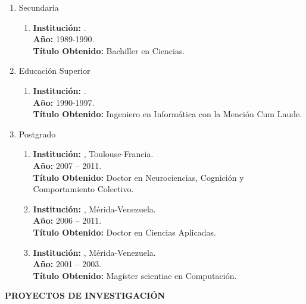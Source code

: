\begin{enumerate}
  \item Secundaria
  \begin{enumerate}[label*=\arabic*.]
    \item \textbf{Institución:} .\\
          \textbf{Año:} 1989-1990.\\
          \textbf{Título Obtenido:} Bachiller en Ciencias.
  \end{enumerate}

  \item Educación Superior
  \begin{enumerate}[label*=\arabic*.]
    \item \textbf{Institución:} .\\
          \textbf{Año:} 1990-1997.\\
          \textbf{Título Obtenido:} Ingeniero en Informática con la Mención Cum Laude.
  \end{enumerate}

  \item Postgrado
  \begin{enumerate}[label*=\arabic*.]
    \item \textbf{Institución:} , Toulouse-Francia.\\
          \textbf{Año:} 2007 – 2011.\\
          \textbf{Título Obtenido:} Doctor en Neurociencias, Cognición y Comportamiento Colectivo.
    \item \textbf{Institución:} , Mérida-Venezuela.\\
          \textbf{Año:} 2006 – 2011.\\
          \textbf{Título Obtenido:} Doctor en Ciencias Aplicadas.
    \item \textbf{Institución:} , Mérida-Venezuela.\\
          \textbf{Año:} 2001 – 2003.\\
          \textbf{Título Obtenido:} Magíster scientiae en Computación.
  \end{enumerate}
\end{enumerate}

\espaciotriple

\noindent\textbf{PROYECTOS DE INVESTIGACIÓN}

